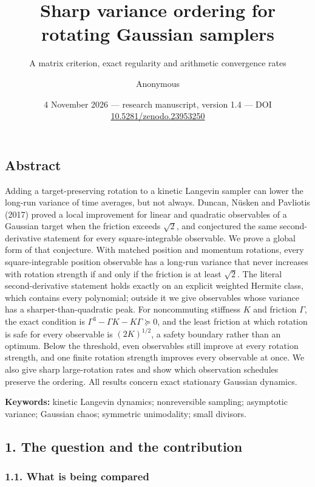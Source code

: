 \documentclass[
  british,
  11pt,
  a4paper,
]{article}
\title{Sharp variance ordering for rotating Gaussian samplers}
\subtitle{A matrix criterion, exact regularity and arithmetic
convergence rates}
\author{Anonymous}
\date{4 November 2026 --- research manuscript, version 1.4 --- DOI
\href{https://doi.org/10.5281/zenodo.23953250}{10.5281/zenodo.23953250}}
\begin{document}
\maketitle

\subsection{Abstract}\label{abstract}

Adding a target-preserving rotation to a kinetic Langevin sampler can
lower the long-run variance of time averages, but not always. Duncan,
Nüsken and Pavliotis (2017) proved a local improvement for linear and
quadratic observables of a Gaussian target when the friction exceeds
\(\sqrt2\), and conjectured the same second-derivative statement for
every square-integrable observable. We prove a global form of that
conjecture. With matched position and momentum rotations, every
square-integrable position observable has a long-run variance that never
increases with rotation strength if and only if the friction is at least
\(\sqrt2\). The literal second-derivative statement holds exactly on an
explicit weighted Hermite class, which contains every polynomial;
outside it we give observables whose variance has a
sharper-than-quadratic peak. For noncommuting stiffness \(K\) and
friction \(\Gamma\), the exact condition is
\(\Gamma^3-\Gamma K-K\Gamma\succeq0\), and the least friction at which
rotation is safe for every observable is \((2K)^{1/2}\), a safety
boundary rather than an optimum. Below the threshold, even observables
still improve at every rotation strength, and one finite rotation
strength improves every observable at once. We also give sharp
large-rotation rates and show which observation schedules preserve the
ordering. All results concern exact stationary Gaussian dynamics.

\textbf{Keywords:} kinetic Langevin dynamics; nonreversible sampling;
asymptotic variance; Gaussian chaos; symmetric unimodality; small
divisors.

\subsection{1. The question and the
contribution}\label{the-question-and-the-contribution}

\subsubsection{1.1. What is being
compared}\label{what-is-being-compared}
\end{document}
